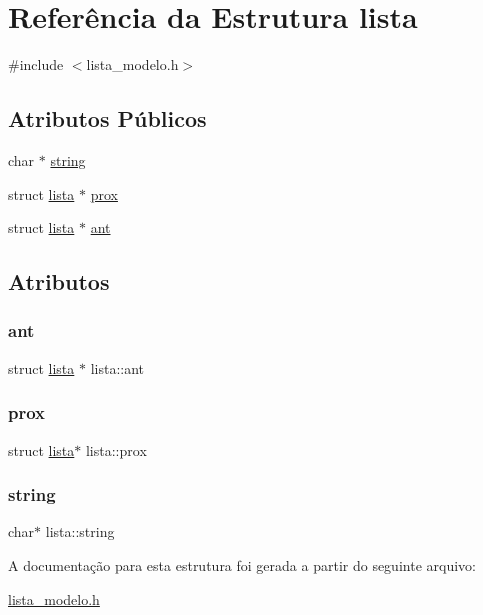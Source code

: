 \hypertarget{structlista}{}\section{Referência da Estrutura lista}
\label{structlista}


{\ttfamily \#include $<$lista\+\_\+modelo.\+h$>$}

\subsection*{Atributos Públicos}
\begin{DoxyCompactItemize}
\item 
char $\ast$ \hyperlink{structlista_a1ba5a9f199d6bf09cb40c905d50685f0}{string}
\item 
struct \hyperlink{structlista}{lista} $\ast$ \hyperlink{structlista_a3b0e375147c1163d74544fd206a1f1de}{prox}
\item 
struct \hyperlink{structlista}{lista} $\ast$ \hyperlink{structlista_a92e5a9da9a7788d2a85de746a88b336f}{ant}
\end{DoxyCompactItemize}


\subsection{Atributos}
\mbox{\label{structlista_a92e5a9da9a7788d2a85de746a88b336f}} 
\subsubsection{\texorpdfstring{ant}{ant}}
{\footnotesize\ttfamily struct \hyperlink{structlista}{lista} $\ast$ lista\+::ant}

\mbox{\label{structlista_a3b0e375147c1163d74544fd206a1f1de}} 
\subsubsection{\texorpdfstring{prox}{prox}}
{\footnotesize\ttfamily struct \hyperlink{structlista}{lista}$\ast$ lista\+::prox}

\mbox{\label{structlista_a1ba5a9f199d6bf09cb40c905d50685f0}} 
\subsubsection{\texorpdfstring{string}{string}}
{\footnotesize\ttfamily char$\ast$ lista\+::string}



A documentação para esta estrutura foi gerada a partir do seguinte arquivo\+:\begin{DoxyCompactItemize}
\item 
\hyperlink{lista__modelo_8h}{lista\+\_\+modelo.\+h}\end{DoxyCompactItemize}
